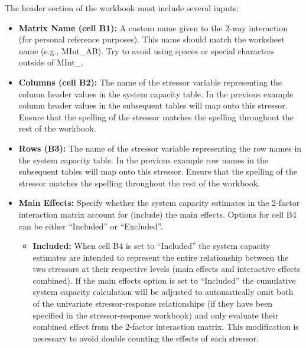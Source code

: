 \documentclass[
  letterpaper,
  DIV=11,
  numbers=noendperiod]{scrreprt}
\begin{document}
The header section of the workbook must include several inputs:

\begin{itemize}
\item
  \textbf{Matrix Name (cell B1):} A custom name given to the 2-way
  interaction (for personal reference purposes). This name should match
  the worksheet name (e.g., MInt\_AB). Try to avoid using spaces or
  special characters outside of MInt\_.
\item
  \textbf{Columns (cell B2):} The name of the stressor variable
  representing the column header values in the system capacity table. In
  the previous example column header values in the subsequent tables
  will map onto this stressor. Ensure that the spelling of the stressor
  matches the spelling throughout the rest of the workbook.
\item
  \textbf{Rows (B3):} The name of the stressor variable representing the
  row names in the system capacity table. In the previous example row
  names in the subsequent tables will map onto this stressor. Ensure
  that the spelling of the stressor matches the spelling throughout the
  rest of the workbook.
\item
  \textbf{Main Effects:} Specify whether the system capacity estimates
  in the 2-factor interaction matrix account for (include) the main
  effects. Options for cell B4 can be either ``Included'' or
  ``Excluded''.

  \begin{itemize}
  \item
    \textbf{Included:} When cell B4 is set to ``Included'' the system
    capacity estimates are intended to represent the entire relationship
    between the two stressors at their respective levels (main effects
    and interactive effects combined). If the main effects option is set
    to ``Included'' the cumulative system capacity calculation will be
    adjusted to automatically omit both of the univariate
    stressor-response relationships (if they have been specified in the
    stressor-response workbook) and only evaluate their combined effect
    from the 2-factor interaction matrix. This modification is necessary
    to avoid double counting the effects of each stressor.


\end{itemize}
\end{itemize}
\end{document}
